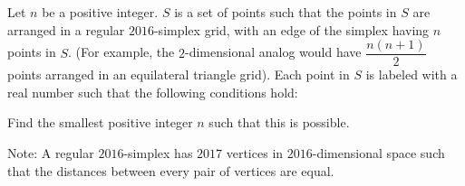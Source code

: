 Let $n$ be a positive integer. $S$ is a set of points such that the points in $S$ are arranged in a regular $2016$-simplex grid, with an edge of the simplex having $n$ points in $S$. (For example, the $2$-dimensional analog would have $\dfrac{n(n+1)}{2}$ points arranged in an equilateral triangle grid). Each point in $S$ is labeled with a real number such that the following conditions hold:

\begin{itemize}
\end{itemize}

Find the smallest positive integer $n$ such that this is possible.

Note: A regular $2016$-simplex has $2017$ vertices in $2016$-dimensional space such that the distances between every pair of vertices are equal.
